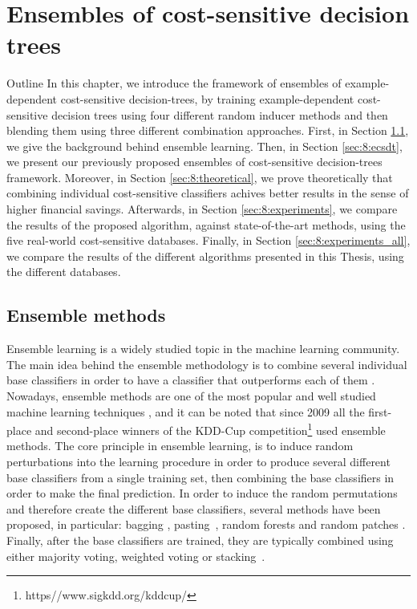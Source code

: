 \chapter{Ensembles of cost-sensitive decision trees}

\begin{remark}{Outline}
In this chapter, we introduce the framework of ensembles of example-dependent cost-sensitive 
decision-trees, by training example-dependent cost-sensitive decision trees using four different 
random inducer methods and then blending them using three different combination approaches.
First, in Section \ref{sec:8:ensemble}, we give the background behind ensemble learning. Then, in 
Section \ref{sec:8:ecsdt}, we present our previously proposed ensembles of cost-sensitive 
decision-trees framework. Moreover, in Section \ref{sec:8:theoretical}, we prove theoretically that 
combining individual cost-sensitive classifiers achives better  results in the sense of higher 
financial savings. Afterwards, in Section \ref{sec:8:experiments}, we compare the results of the 
proposed algorithm, against state-of-the-art methods, using the five real-world cost-sensitive 
databases. Finally, in Section \ref{sec:8:experiments_all}, we compare the results of the different 
algorithms presented in this Thesis, using the different databases.
\end{remark}


\section{Ensemble methods}
\label{sec:8:ensemble}

  Ensemble learning is a widely studied topic in the machine learning community. The main
  idea behind the ensemble methodology is to combine several individual base classifiers in
  order to have a classifier that outperforms each of them \citep{Rokach2009}. Nowadays, 
  ensemble methods are  one of the most popular and well studied machine learning techniques 
  \citep{Zhou2012}, and it can be noted that since 2009 all the first-place and 
  second-place winners of the KDD-Cup competition\footnote{https\://www.sigkdd.org/kddcup/} used 
  ensemble methods. The core principle in ensemble learning, is to induce random perturbations into 
  the learning procedure in order to produce several different base classifiers from a single 
  training set, then combining the base classifiers in order to make the final prediction.
  In order to induce the random permutations and therefore create the different base classifiers, 
  several methods have been proposed, in particular: bagging \citep{Breiman1996}, 
  pasting~\citep{Breiman1999}, random forests \citep{Breiman2001} and random patches 
  \citep{Louppe2012}. Finally, after  the base   classifiers are trained, they are typically 
  combined using either   majority voting,  weighted  voting    or  stacking~\citep{Zhou2012}.


